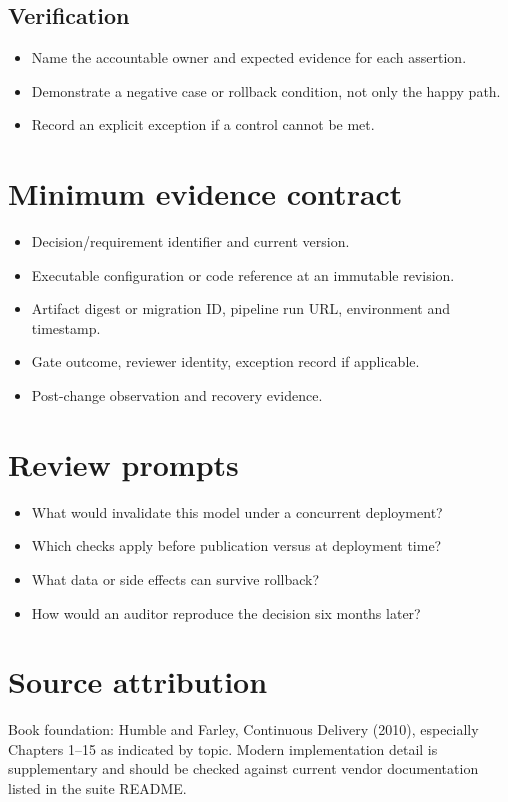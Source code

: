\documentclass[10pt,letterpaper]{article}
\begin{document}
\subsection{Verification}
\begin{itemize}
\item Name the accountable owner and expected evidence for each assertion.
\item Demonstrate a negative case or rollback condition, not only the happy path.
\item Record an explicit exception if a control cannot be met.
\end{itemize}


\section{Minimum evidence contract}
\begin{itemize}
\item Decision/requirement identifier and current version.
\item Executable configuration or code reference at an immutable revision.
\item Artifact digest or migration ID, pipeline run URL, environment and timestamp.
\item Gate outcome, reviewer identity, exception record if applicable.
\item Post-change observation and recovery evidence.
\end{itemize}

\section{Review prompts}
\begin{itemize}
\item What would invalidate this model under a concurrent deployment?
\item Which checks apply before publication versus at deployment time?
\item What data or side effects can survive rollback?
\item How would an auditor reproduce the decision six months later?
\end{itemize}

\section{Source attribution}
Book foundation: Humble and Farley, Continuous Delivery (2010), especially Chapters 1--15 as indicated by topic. Modern implementation detail is supplementary and should be checked against current vendor documentation listed in the suite README.
\end{document}
